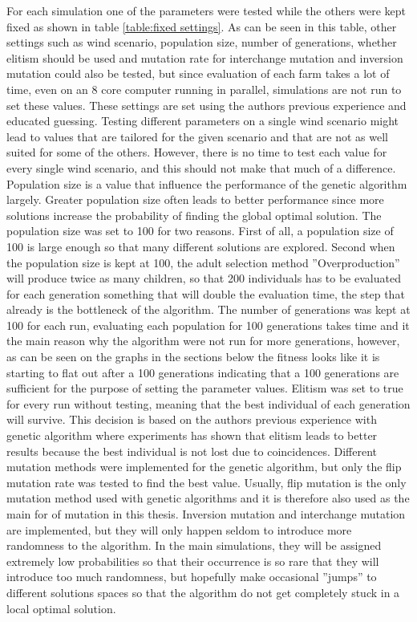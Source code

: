 \noindent For each simulation one of the parameters were tested while the others were kept fixed as shown in table \ref{table:fixed settings}. As can be seen in this table, other settings such as wind scenario, population size, number of generations, whether elitism should be used and mutation rate for interchange mutation and inversion mutation could also be tested, but since evaluation of each farm takes a lot of time, even on an 8 core computer running in parallel, simulations are not run to set these values. These settings are set using the authors previous experience and educated guessing. Testing different parameters on a single wind scenario might lead to values that are tailored for the given scenario and that are not as well suited for some of the others. However, there is no time to test each value for every single wind scenario, and this should not make that much of a difference. Population size is a value that influence the performance of the genetic algorithm largely. Greater population size often leads to better performance since more solutions increase the probability of finding the global optimal solution. The population size was set to 100 for two reasons. First of all, a population size of 100 is large enough so that many different solutions are explored. Second when the population size is kept at 100, the adult selection method ''Overproduction'' will produce twice as many children, so that 200 individuals has to be evaluated for each generation something that will double the evaluation time, the step that already is the bottleneck of the algorithm. The number of generations was kept at 100 for each run, evaluating each population for 100 generations takes time and it the main reason why the algorithm were not run for more generations, however, as can be seen on the graphs in the sections below the fitness looks like it is starting to flat out after a 100 generations indicating that a 100 generations are sufficient for the purpose of setting the parameter values. Elitism was set to true for every run without testing, meaning that the best individual of each generation will survive. This decision is based on the authors previous experience with genetic algorithm where experiments has shown that elitism leads to better results because the best individual is not lost due to coincidences. Different mutation methods were implemented for the genetic algorithm, but only the flip mutation rate was tested to find the best value. Usually, flip mutation is the only mutation method used with genetic algorithms and it is therefore also used as the main for of mutation in this thesis. Inversion mutation and interchange mutation are implemented, but they will only happen seldom to introduce more randomness to the algorithm. In the main simulations, they will be assigned extremely low probabilities so that their occurrence is so rare that they will introduce too much randomness, but hopefully make occasional ''jumps'' to different solutions spaces so that the algorithm do not get completely stuck in a local optimal solution. 


